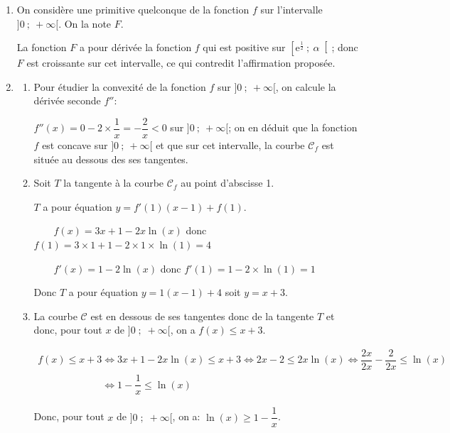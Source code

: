 \documentclass[10pt]{article}
\providecommand{\e}{{\mathrm{e}}}
\begin{document}
\begin{enumerate}
\begin{enumerate}
		
	\end{enumerate}	
\item On considère une primitive quelconque de la fonction $f$ sur
l'intervalle $]0~;~+\infty[$. On la note $F$.



La fonction $F$ a pour dérivée la fonction $f$ qui est positive sur $\left[\e^{\frac12}~;~\alpha\right[$; donc $F$ est croissante sur cet intervalle, ce qui contredit l'affirmation proposée.
\item
	\begin{enumerate}
		\item Pour étudier la convexité de la fonction $f$ sur $]0~;~+\infty[$, on calcule la dérivée seconde $f''$:
		
$f''(x)=0-2\times \dfrac{1}{x}=-\dfrac{2}{x}<0$ sur $]0~;~+\infty[$; on en déduit que la fonction $f$ est concave sur $]0~;~+\infty[$ et que sur cet intervalle,  la courbe $\mathcal{C}_f$ est située au dessous des ses tangentes.
		\item Soit $T$ la tangente à la courbe $\mathcal{C}_f$ au point d'abscisse 1.

$T$ a pour équation $y=f'(1)\left (x-1\right ) + f(1)$.

~~\textbullet~~$f(x)=3x+1-2x\ln(x)$ donc $f(1)=3\times 1 +1 -2\times 1 \times \ln(1)=4$

~~\textbullet~~$f'(x)=1-2\ln(x)$ donc $f'(1)=1-2\times\ln(1)=1$

Donc $T$ a pour équation $y=1\left (x-1\right ) +4$ soit $y=x+3$.
		
		\item 
La courbe $\mathcal{C}$ est en dessous de ses tangentes donc de la tangente $T$ et donc, pour tout $x$ de $]0\;;\;+\infty[$, on a $f(x)\leqslant x+3$.

$\begin{gathered}f(x)\leqslant x+3
\iff 3x+1-2x\ln(x) \leqslant x+3
\iff 2x-2 \leqslant 2x\ln(x)
\iff \dfrac{2x}{2x} - \dfrac{2}{2x} \leqslant \ln(x)\\
\phantom{f(x)\leqslant x+3}
\iff 1-\dfrac{1}{x} \leqslant \ln(x)\end{gathered}$

Donc, pour tout  $x$ de $]0\;;\;+\infty[$, on a: $\ln(x)\geqslant 1-\dfrac{1}{x}$.
		
	\end{enumerate}
\end{enumerate}

\bigskip
\end{document}
